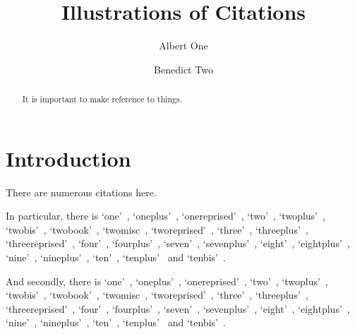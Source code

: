 \documentclass[authoryear,10pt,5p,times]{elsarticle}
\begin{document}
\begin{frontmatter}
\title{Illustrations of Citations}

\author[ao]{Albert One}
\address[ao]{A Place, Somewhere}

\author[bt]{Benedict Two}
\address[bt]{Elsewhere, On Earth}

\begin{abstract}
It is important to make reference to things.
\end{abstract}

\end{frontmatter}

%

\section{Introduction}

There are numerous citations here.

In particular, there is
`one'~\citep{one},
`oneplus'~\citep{oneplus},
`onereprised'~\citep{onereprised},
`two'~\citep{two},
`twoplus'~\citep{twoplus},
`twobis'~\citep{twobis},
`twobook'~\citep{twobook},
`twomisc~\citep{twomisc},
`tworeprised'~\citep{tworeprised},
`three'~\citep{three},
`threeplus'~\citep{threeplus},
`threereprised'~\citep{threereprised},
`four'~\citep{four},
`fourplus'~\citep{fourplus},
`seven'~\citep{seven},
`sevenplus'~\citep{sevenplus},
`eight'~\citep{eight},
`eightplus'~\citep{eightplus},
`nine'~\citep{nine},
`nineplus'~\citep{nineplus},
`ten'~\citep{ten},
`tenplus'~\citep{tenplus} and
`tenbis'~\citep{tenbis}.

And secondly, there is
`one'~\citep{one},
`oneplus'~\citep{oneplus},
`onereprised'~\citep{onereprised},
`two'~\citep{two},
`twoplus'~\citep{twoplus},
`twobis'~\citep{twobis},
`twobook'~\citep{twobook},
`twomisc~\citep{twomisc},
`tworeprised'~\citep{tworeprised},
`three'~\citep{three},
`threeplus'~\citep{threeplus},
`threereprised'~\citep{threereprised},
`four'~\citep{four},
`fourplus'~\citep{fourplus},
`seven'~\citep{seven},
`sevenplus'~\citep{sevenplus},
`eight'~\citep{eight},
`eightplus'~\citep{eightplus},
`nine'~\citep{nine},
`nineplus'~\citep{nineplus},
`ten'~\citep{ten},
`tenplus'~\citep{tenplus} and
`tenbis'~\citep{tenbis}.



%



\end{document}
